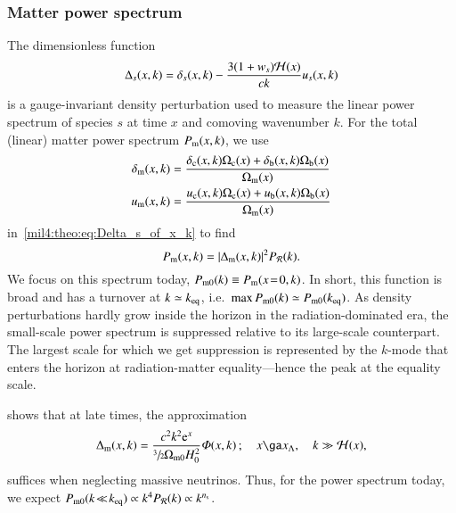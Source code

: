 \subsubsection{Matter power spectrum}
    The dimensionless function
    \begin{equation}\label{mil4:theo:eq:Delta_s_of_x_k}
        \Delta_s (x,k) = \delta_s(x,k) - \frac{3(1+w_s)\Hp(x)}{ck}u_s(x,k)
    \end{equation}
    is a gauge-invariant density perturbation used to measure the linear power spectrum of species $s$ at time $x$ and comoving wavenumber $k$. For the total (linear) matter power spectrum $P\ped{m}(x,k)$, we use
    \begin{equation}
    \begin{split}
        \delta\ped{m}(x,k) &= \frac{\delta\ped{c}(x,k) \Omega\ped{c}(x) + \delta\ped{b}(x,k) \Omega\ped{b}(x)}{\OmgM[](x)} \\
        u\ped{m}(x,k) &= \frac{u\ped{c}(x,k) \Omega\ped{c}(x) + u\ped{b}(x,k) \Omega\ped{b}(x)}{\OmgM[](x)}
    \end{split}
    \end{equation}
    in~\cref{mil4:theo:eq:Delta_s_of_x_k} to find
    \begin{equation}\label{mil4:theo:eq:matter_power_spectrum}
        P\ped{m}(x,k) = \abs{\Delta\ped{m}(x,k)}^2 P_\mathcal{R}(k).
    \end{equation}
    We focus on this spectrum today, $P\ped{m0}(k) \equiv P\ped{m}(x\!=\!0,k)$. In short, this function is broad and has a turnover at $k\simeq k\ped{eq}$, i.e.~$\max{P\ped{m0}(k)} \simeq P\ped{m0}(k\ped{eq})$. As density perturbations hardly grow inside the horizon in the radiation-dominated era, the small-scale power spectrum is suppressed relative to its large-scale counterpart. The largest scale for which we get suppression is represented by the $k$-mode that enters the horizon at radiation-matter equality---hence the peak at the equality scale.

    \citet{DodelsonBook} shows that at late times, the approximation
    \begin{equation}\label{mil4:theo:eq:dimless_matter_power_spectrum}
        \Delta\ped{m}(x,k) = \frac{c^2k^2 \eu[x]}{\sfrac{3}{2} \OmgM H_0^2 } \Phi(x,k)\,; \quad x \ga x\ped{\Lambda} ,\quad  k \gg \Hp(x),
    \end{equation}
    suffices when neglecting massive neutrinos. Thus, for the power spectrum today, we expect $P\ped{m0}(k\!\ll\!k\ped{eq}) \propto k^4P_\mathcal{R}(k) \propto k^{\ns}$. 



